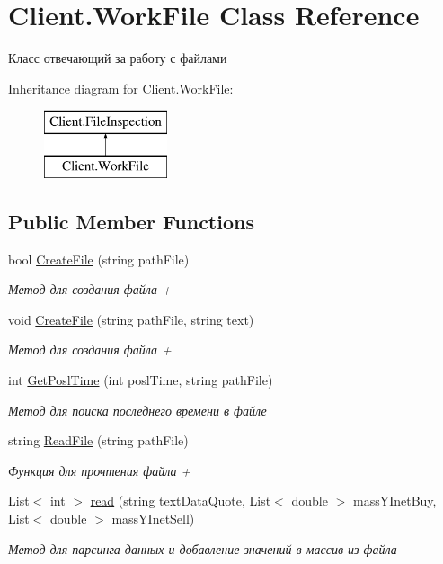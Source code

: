 \hypertarget{class_client_1_1_work_file}{}\section{Client.\+Work\+File Class Reference}
\label{class_client_1_1_work_file}


Класс отвечающий за работу с файлами  


Inheritance diagram for Client.\+Work\+File\+:\begin{figure}[H]
\begin{center}
\leavevmode
\includegraphics[height=2.000000cm]{class_client_1_1_work_file}
\end{center}
\end{figure}
\subsection*{Public Member Functions}
\begin{DoxyCompactItemize}
\item 
bool \hyperlink{class_client_1_1_work_file_a2133a018059220ccb5eca90ea39f0f72}{Create\+File} (string path\+File)
\begin{DoxyCompactList}\small\item\em Метод для создания файла + \end{DoxyCompactList}\item 
void \hyperlink{class_client_1_1_work_file_a1a78c0750e5d9e3f6e47f2a18d73ad14}{Create\+File} (string path\+File, string text)
\begin{DoxyCompactList}\small\item\em Метод для создания файла + \end{DoxyCompactList}\item 
int \hyperlink{class_client_1_1_work_file_aa6be3320b601af43b26ad4ad964cdc4f}{Get\+Posl\+Time} (int posl\+Time, string path\+File)
\begin{DoxyCompactList}\small\item\em Метод для поиска последнего времени в файле \end{DoxyCompactList}\item 
string \hyperlink{class_client_1_1_work_file_ac8d171e560e68dc71132752679d3387e}{Read\+File} (string path\+File)
\begin{DoxyCompactList}\small\item\em Функция для прочтения файла + \end{DoxyCompactList}\item 
List$<$ int $>$ \hyperlink{class_client_1_1_work_file_a98c27a5faa8b82ec7f64c9368d54c19a}{read} (string text\+Data\+Quote, List$<$ double $>$ mass\+Y\+Inet\+Buy, List$<$ double $>$ mass\+Y\+Inet\+Sell)
\begin{DoxyCompactList}\small\item\em Метод для парсинга данных и добавление значений в массив из файла \end{DoxyCompactList}\end{DoxyCompactItemize}
